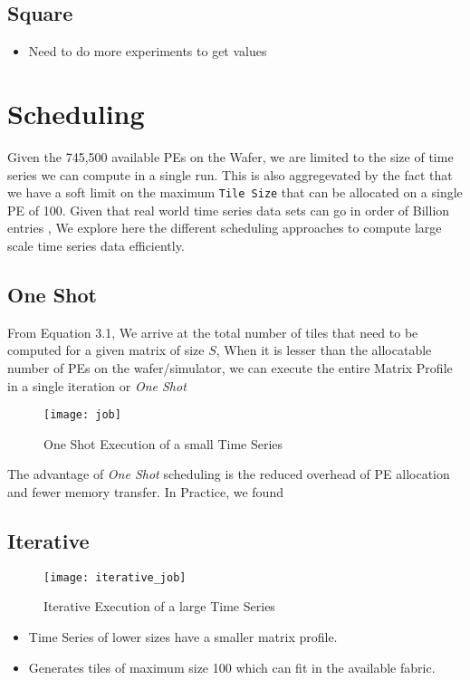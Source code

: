 \subsection{Square}

\begin{itemize}
    \item Need to do more experiments to get values
\end{itemize}


\section{Scheduling}

Given the 745,500 available PEs on the Wafer, we are limited to the size of time series we can compute in a single run. This is also aggregevated by the fact that we have a soft limit on the maximum \texttt{Tile Size} that can be allocated on a single PE of 100.
Given that real world time series data sets can go in order of Billion entries \cite{8}, We explore here the different scheduling approaches to compute large scale time series data efficiently. 

\subsection{One Shot}

From Equation 3.1, We arrive at the total number of tiles that need to be computed for a given matrix of size $S$, When it is lesser than the allocatable number of PEs on the wafer/simulator, we can execute the entire Matrix Profile in a single iteration or \textit{One Shot}

\begin{figure}[h!]
    \texttt{[image: job]}
    \centering
    \caption{One Shot Execution of a small Time Series}
\end{figure}

The advantage of \textit{One Shot} scheduling is the reduced overhead of PE allocation and fewer memory transfer. In Practice, we found 
\subsection{Iterative}

\begin{figure}[h!]
    \texttt{[image: iterative\_job]}
    \centering
    \caption{Iterative Execution of a large Time Series}
\end{figure}


\begin{itemize}
    \item Time Series of lower sizes have a smaller matrix profile.
    \item Generates tiles of maximum size 100 which can fit in the available fabric.
\end{itemize}
